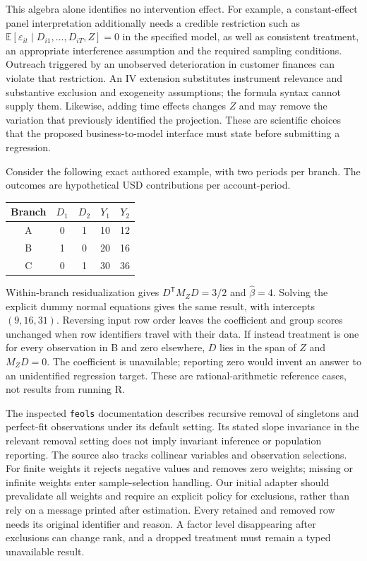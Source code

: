 This algebra alone identifies no intervention effect. For example, a
constant-effect panel interpretation additionally needs a credible restriction
such as $\mathbb E[\varepsilon_{it}\mid D_{i1},\ldots,D_{iT},Z]=0$ in the
specified model, as well as consistent treatment, an appropriate interference
assumption and the required sampling conditions. Outreach triggered by an
unobserved deterioration in customer finances can violate that restriction.
An IV extension substitutes instrument relevance and substantive exclusion
and exogeneity assumptions; the formula syntax cannot supply them. Likewise,
adding time effects changes $Z$ and may remove the variation that previously
identified the projection. These are scientific choices that the proposed
business-to-model interface must state before submitting a regression.

Consider the following exact authored example, with two periods per branch.
The outcomes are hypothetical USD contributions per account-period.
\begin{center}
\begin{tabular}{c|cc|cc}
Branch & $D_1$ & $D_2$ & $Y_1$ & $Y_2$\\\hline
A & 0 & 1 & 10 & 12\\
B & 1 & 0 & 20 & 16\\
C & 0 & 1 & 30 & 36
\end{tabular}
\end{center}
Within-branch residualization gives $D^{\mathsf T}M_ZD=3/2$ and
$\widehat\beta=4$. Solving the explicit dummy normal equations gives the
same result, with intercepts $(9,16,31)$. Reversing input row order leaves
the coefficient and group scores unchanged when row identifiers travel with
their data. If instead treatment is one for every observation in B and zero
elsewhere, $D$ lies in the span of $Z$ and $M_ZD=0$. The coefficient is
unavailable; reporting zero would invent an answer to an unidentified
regression target. These are rational-arithmetic reference cases,
not results from running R.\citep{exec20_fixest_reference}

The inspected \texttt{feols} documentation describes recursive removal of
singletons and perfect-fit observations under its default setting. Its stated
slope invariance in the relevant removal setting does not imply invariant
inference or population reporting. The source also tracks collinear variables
and observation selections. For finite weights it rejects negative values
and removes zero weights; missing or infinite weights enter sample-selection
handling. Our initial adapter should prevalidate all weights and require an
explicit policy for exclusions, rather than rely on a message printed after
estimation. Every retained and removed row needs its original identifier and
reason. A factor level disappearing after exclusions can change rank, and a
dropped treatment must remain a typed unavailable result.\citep{exec20_fixest_source}

